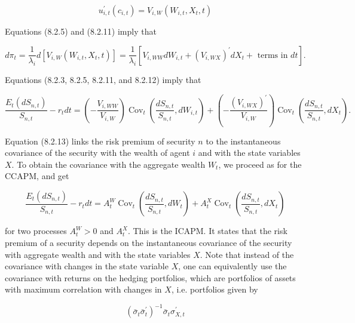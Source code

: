 \documentclass[\topdir/lecture\_notes.tex]{subfiles}
\begin{document}
\begin{equation}
u_{i, t}^{\prime}\left(c_{i, t}\right)=V_{i, W}\left(W_{i, t}, X_{t}, t\right) \label{eq:8.2.11}
\end{equation}

Equations (8.2.5) and (8.2.11) imply that

\begin{equation}
d \pi_{t}=\frac{1}{\lambda_{i}} d\left[V_{i, W}\left(W_{i, t}, X_{t}, t\right)\right]=\frac{1}{\lambda_{i}}\left[V_{i, W W} d W_{i, t}+\left(V_{i, W X}\right)^{\prime} d X_{t}+\text { terms in } d t\right] . \label{eq:8.2.12}
\end{equation}

Equations (8.2.3, 8.2.5, 8.2.11, and 8.2.12) imply that

\begin{equation}
\frac{E_{t}\left(d S_{n, t}\right)}{S_{n, t}}-r_{t} d t=\left(-\frac{V_{i, W W}}{V_{i, W}}\right) \operatorname{Cov}_{t}\left(\frac{d S_{n, t}}{S_{n, t}}, d W_{i, t}\right)+\left(-\frac{\left(V_{i, W X}\right)^{\prime}}{V_{i, W}}\right) \operatorname{Cov}_{t}\left(\frac{d S_{n, t}}{S_{n, t}}, d X_{t}\right) . \label{eq:8.2.13}
\end{equation}

Equation (8.2.13) links the risk premium of security \(n\) to the instantaneous covariance of the security with the wealth of agent \(i\) and with the state variables \(X\). To obtain the covariance with the aggregate wealth \(W_{t}\), we proceed as for the CCAPM, and get

\begin{equation}
\frac{E_{t}\left(d S_{n, t}\right)}{S_{n, t}}-r_{t} d t=A_{t}^{W} \operatorname{Cov}_{t}\left(\frac{d S_{n, t}}{S_{n, t}}, d W_{t}\right)+A_{t}^{X} \operatorname{Cov}_{t}\left(\frac{d S_{n, t}}{S_{n, t}}, d X_{t}\right) \label{eq:8.2.14}
\end{equation}

for two processes \(A_{t}^{W}>0\) and \(A_{t}^{X}\). This is the ICAPM. It states that the risk premium of a security depends on the instantaneous covariance of the security with aggregate wealth and with the state variables \(X\). Note that instead of the covariance with changes in the state variable \(X\), one can equivalently use the covariance with returns on the hedging portfolios, which are portfolios of assets with maximum correlation with changes in \(X\), i.e. portfolios given by

\begin{equation}
\left(\bar{\sigma}_{t} \bar{\sigma}_{t}^{\prime}\right)^{-1} \bar{\sigma}_{t} \sigma_{X, t}^{\prime}
\end{equation}
\end{document}
